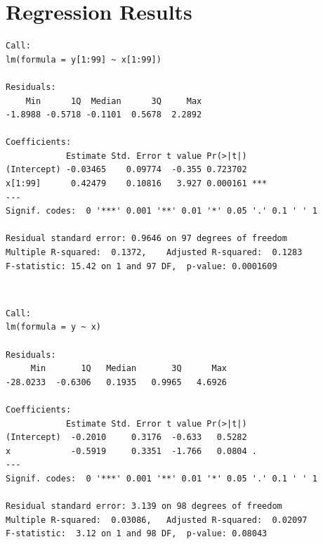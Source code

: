 \documentclass[11pt, oneside]{article}
\begin{document}
\section*{Regression Results}
\begin{verbatim}
Call:
lm(formula = y[1:99] ~ x[1:99])

Residuals:
    Min      1Q  Median      3Q     Max 
-1.8988 -0.5718 -0.1101  0.5678  2.2892 

Coefficients:
            Estimate Std. Error t value Pr(>|t|)    
(Intercept) -0.03465    0.09774  -0.355 0.723702    
x[1:99]      0.42479    0.10816   3.927 0.000161 ***
---
Signif. codes:  0 '***' 0.001 '**' 0.01 '*' 0.05 '.' 0.1 ' ' 1

Residual standard error: 0.9646 on 97 degrees of freedom
Multiple R-squared:  0.1372,	Adjusted R-squared:  0.1283 
F-statistic: 15.42 on 1 and 97 DF,  p-value: 0.0001609 
\end{verbatim}  

\mbox{}\\

\begin{verbatim}
Call:
lm(formula = y ~ x)

Residuals:
     Min       1Q   Median       3Q      Max 
-28.0233  -0.6306   0.1935   0.9965   4.6926 

Coefficients:
            Estimate Std. Error t value Pr(>|t|)  
(Intercept)  -0.2010     0.3176  -0.633   0.5282  
x            -0.5919     0.3351  -1.766   0.0804 .
---
Signif. codes:  0 '***' 0.001 '**' 0.01 '*' 0.05 '.' 0.1 ' ' 1

Residual standard error: 3.139 on 98 degrees of freedom
Multiple R-squared:  0.03086,	Adjusted R-squared:  0.02097 
F-statistic:  3.12 on 1 and 98 DF,  p-value: 0.08043
\end{verbatim} 
\newpage
\end{document}
